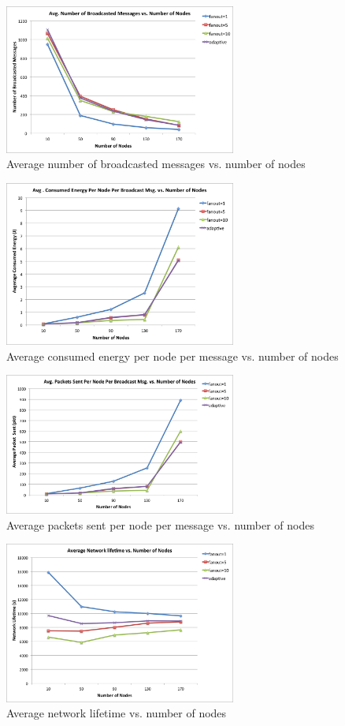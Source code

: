 \begin{figure}
	\centering
	\includegraphics[width=3in]{brNum.png}
	\caption{Average number of broadcasted messages vs. number of nodes}
	\label{fig:brNum}
\end{figure}

\begin{figure}
	\centering
	\includegraphics[width=3in]{energy.png}
	\caption{Average consumed energy per node per message vs. number of nodes}
	\label{fig:energy}
\end{figure}

\begin{figure}
	\centering
	\includegraphics[width=3in]{overhead.png}
	\caption{Average packets sent per node per message vs. number of nodes}
	\label{fig:overhead}
\end{figure}

\begin{figure}
	\centering
	\includegraphics[width=3in]{life.png}
	\caption{Average network lifetime vs. number of nodes}
	\label{fig:life}
\end{figure}



